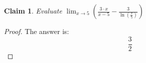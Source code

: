 \documentclass{article}
\newtheorem{theorem}{Claim}
\begin{document}
\begin{theorem}
Evaluate
$ \lim_{x \to 5} \left( \frac{ 3 \cdot x }{ x-5 }-\frac{ 3 }{ \ln\left(\frac{ x }{ 5 }\right) } \right) $
\end{theorem}

\begin{proof}
The answer is:
\[
\frac{3}{2}
\]
\end{proof}
\end{document}

